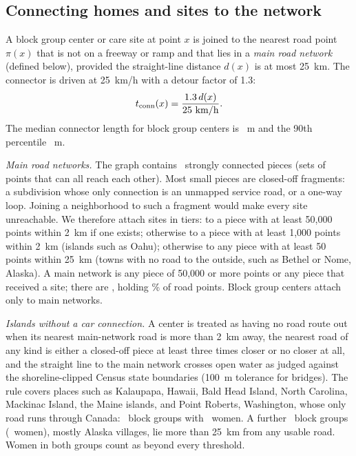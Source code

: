 \documentclass[10pt,twocolumn,letterpaper]{article}
\begin{document}
\subsection{Connecting homes and sites to the network}
A block group center or care site at point $x$ is joined to the nearest road point $\pi(x)$ that is not on a freeway or ramp and that lies in a \emph{main road network} (defined below), provided the straight-line distance $d(x)$ is at most 25~km. The connector is driven at 25~km/h with a detour factor of 1.3:
\begin{equation}
t_{\rm conn}(x)=\frac{1.3\,d(x)}{25~\text{km/h}}.\label{eq:conn}
\end{equation}
The median connector length for block group centers is \SnapMedianM~m and the 90th percentile \SnapPNinetyM~m.

\emph{Main road networks.} The graph contains \Components\ strongly connected pieces (sets of points that can all reach each other). Most small pieces are closed-off fragments: a subdivision whose only connection is an unmapped service road, or a one-way loop. Joining a neighborhood to such a fragment would make every site unreachable. We therefore attach sites in tiers: to a piece with at least 50,000 points within 2~km if one exists; otherwise to a piece with at least 1,000 points within 2~km (islands such as Oahu); otherwise to any piece with at least 50 points within 25~km (towns with no road to the outside, such as Bethel or Nome, Alaska). A main network is any piece of 50,000 or more points or any piece that received a site; there are \MainNetworks, holding \ShareMain\% of road points. Block group centers attach only to main networks.

\emph{Islands without a car connection.} A center is treated as having no road route out when its nearest main-network road is more than 2~km away, the nearest road of any kind is either a closed-off piece at least three times closer or no closer at all, and the straight line to the main network crosses open water as judged against the shoreline-clipped Census state boundaries (100~m tolerance for bridges). The rule covers places such as Kalaupapa, Hawaii, Bald Head Island, North Carolina, Mackinac Island, the Maine islands, and Point Roberts, Washington, whose only road runs through Canada: \BGSep\ block groups with \WomenSep\ women. A further \BGNoRoad\ block groups (\WomenNoRoad\ women), mostly Alaska villages, lie more than 25~km from any usable road. Women in both groups count as beyond every threshold.
\end{document}

